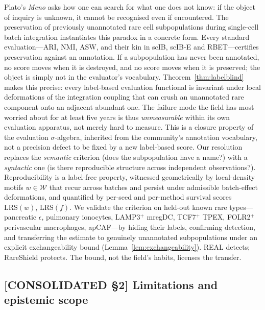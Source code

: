 Plato's \emph{Meno} asks how one can search for what one does not know: if the object of inquiry is unknown, it cannot be recognised even if encountered. The preservation of previously unannotated rare cell subpopulations during single-cell batch integration instantiates this paradox in a concrete form. Every standard evaluation---$\mathrm{ARI}$, $\mathrm{NMI}$, $\mathrm{ASW}$, and their kin in scIB, scIB-E and RBET---certifies preservation against an annotation. If a subpopulation has never been annotated, no score moves when it is destroyed, and no score moves when it is preserved; the object is simply not in the evaluator's vocabulary. Theorem~\ref{thm:labelblind} makes this precise: every label-based evaluation functional is invariant under local deformations of the integration coupling that can crush an unannotated rare component onto an adjacent abundant one. The failure mode the field has most worried about for at least five years is thus \emph{unmeasurable} within its own evaluation apparatus, not merely hard to measure. This is a closure property of the evaluation $\sigma$-algebra, inherited from the community's annotation vocabulary, not a precision defect to be fixed by a new label-based score. Our resolution replaces the \emph{semantic} criterion (does the subpopulation have a name?) with a \emph{syntactic} one (is there reproducible structure across independent observations?). Reproducibility is a label-free property, witnessed geometrically by local-density motifs $w \in \mathcal{W}$ that recur across batches and persist under admissible batch-effect deformations, and quantified by per-seed and per-method survival scores $\mathrm{LRS}(w)$, $\mathrm{LRS}(f)$. We validate the criterion on held-out known rare types---pancreatic $\epsilon$, pulmonary ionocytes, LAMP3$^+$ mregDC, TCF7$^+$ TPEX, FOLR2$^+$ perivascular macrophages, apCAF---by hiding their labels, confirming detection, and transferring the estimate to genuinely unannotated subpopulations under an explicit exchangeability bound (Lemma~\ref{lem:exchangeability}). REAL detects; RareShield protects. The bound, not the field's habits, licenses the transfer.

\subsection*{[CONSOLIDATED §2] Limitations and epistemic scope}
\label{philo:limitations}

